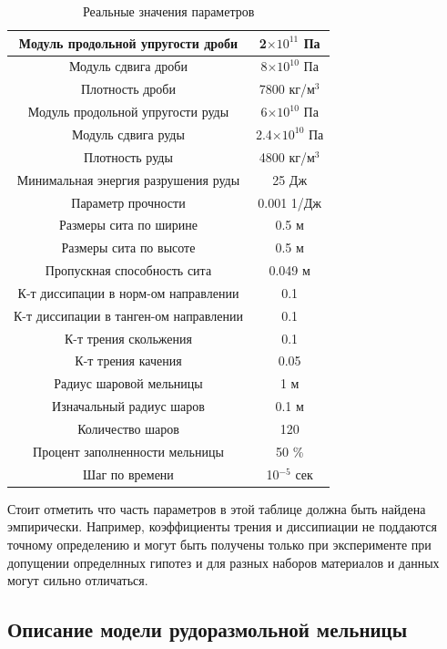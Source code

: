 \documentclass[utf8x, 14pt, oneside, a4paper]{article}
\begin{document}
\begin{table}[H]
\caption{Реальные значения параметров}
\begin{tabular}{|c|c|}
\hline
Модуль продольной упругости дроби & 2$\times 10^{11}$ Па  \\ 
\hline
Модуль сдвига дроби & 8$\times 10^{10}$ Па \\  
\hline
Плотность дроби & 7800 кг/м$^3$ \\
\hline
Модуль продольной упругости руды & 6$\times 10^{10}$ Па  \\ 
\hline
Модуль сдвига руды & 2.4$\times 10^{10}$ Па \\  
\hline
Плотность руды & 4800 кг/м$^3$ \\
\hline
Минимальная энергия разрушения руды & 25 Дж \\
\hline
Параметр прочности & 0.001 1/Дж \\
\hline
Размеры сита по ширине & 0.5 м \\
\hline
Размеры сита по высоте & 0.5 м \\
\hline
Пропускная способность сита & 0.049 м \\
\hline
К-т диссипации в норм-ом направлении & 0.1 \\
\hline
К-т диссипации в танген-ом направлении & 0.1 \\
\hline
К-т трения скольжения & 0.1 \\
\hline
К-т трения качения & 0.05 \\
\hline
Радиус шаровой мельницы & 1 м \\
\hline
Изначальный радиус шаров & 0.1 м \\
\hline
Количество шаров & 120 \\
\hline
Процент заполненности мельницы & 50 \% \\
\hline
Шаг по времени & 10$^{-5}$ сек \\
\hline
\end{tabular}
\end{table}

Стоит отметить что часть параметров в этой таблице должна быть найдена эмпирически. 
Например, коэффициенты трения и диссипиации не поддаются точному определению и могут быть получены только при эксперименте при допущении определнных гипотез и для разных наборов материалов и данных могут сильно отличаться.

\subsection{Описание модели рудоразмольной мельницы}
\end{document}
